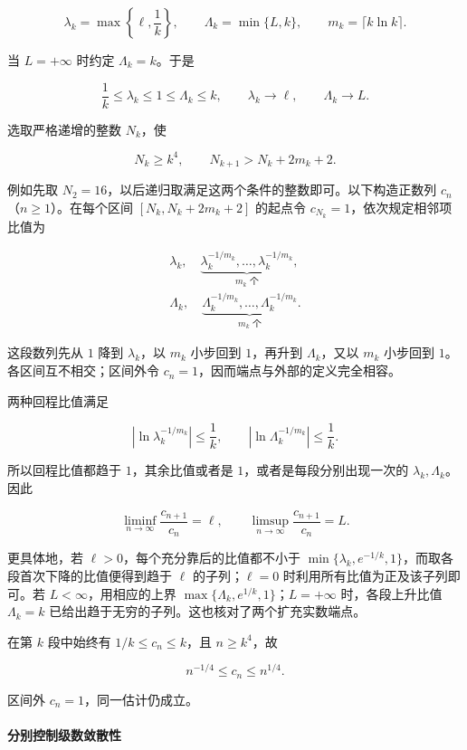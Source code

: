 \documentclass[11pt,a4paper]{article}
\begin{document}
\[
\lambda_k=\max\left\{\ell,\frac1k\right\},
\qquad \Lambda_k=\min\{L,k\},
\qquad m_k=\lceil k\ln k\rceil.
\]

当 \(L=+\infty\) 时约定 \(\Lambda_k=k\)。于是

\[
\frac1k\le\lambda_k\le1\le\Lambda_k\le k,
\qquad \lambda_k\to\ell,
\qquad \Lambda_k\to L.
\]

选取严格递增的整数 \(N_k\)，使

\[
N_k\ge k^4,
\qquad N_{k+1}>N_k+2m_k+2.
\]

例如先取 \(N_2=16\)，以后递归取满足这两个条件的整数即可。以下构造正数列
\(c_n\)（\(n\ge1\)）。在每个区间 \([N_k,N_k+2m_k+2]\) 的起点令
\(c_{N_k}=1\)，依次规定相邻项比值为

\[
\begin{gathered}
\lambda_k,
\quad \underbrace{\lambda_k^{-1/m_k},\ldots,
\lambda_k^{-1/m_k}}_{m_k\text{ 个}},\\
\Lambda_k,
\quad \underbrace{\Lambda_k^{-1/m_k},\ldots,
\Lambda_k^{-1/m_k}}_{m_k\text{ 个}}.
\end{gathered}
\]

这段数列先从 \(1\) 降到 \(\lambda_k\)，以 \(m_k\) 小步回到 \(1\)，再升到
\(\Lambda_k\)，又以 \(m_k\) 小步回到 \(1\)。各区间互不相交；区间外令
\(c_n=1\)，因而端点与外部的定义完全相容。

两种回程比值满足

\[
\left|\ln\lambda_k^{-1/m_k}\right|\le\frac1k,
\qquad
\left|\ln\Lambda_k^{-1/m_k}\right|\le\frac1k.
\]

所以回程比值都趋于 \(1\)，其余比值或者是 \(1\)，或者是每段分别出现一次的
\(\lambda_k,\Lambda_k\)。因此

\[
\liminf_{n\to\infty}\frac{c_{n+1}}{c_n}=\ell,
\qquad
\limsup_{n\to\infty}\frac{c_{n+1}}{c_n}=L.
\]

更具体地，若 \(\ell>0\)，每个充分靠后的比值都不小于
\(\min\{\lambda_k,e^{-1/k},1\}\)，而取各段首次下降的比值便得到趋于
\(\ell\) 的子列；\(\ell=0\) 时利用所有比值为正及该子列即可。若
\(L<\infty\)，用相应的上界
\(\max\{\Lambda_k,e^{1/k},1\}\)；\(L=+\infty\) 时，各段上升比值
\(\Lambda_k=k\) 已给出趋于无穷的子列。这也核对了两个扩充实数端点。

在第 \(k\) 段中始终有 \(1/k\le c_n\le k\)，且 \(n\ge k^4\)，故

\[
n^{-1/4}\le c_n\le n^{1/4}.
\]

区间外 \(c_n=1\)，同一估计仍成立。

\paragraph{分别控制级数敛散性}\label{ux5206ux522bux63a7ux5236ux7ea7ux6570ux655bux6563ux6027}
\end{document}
